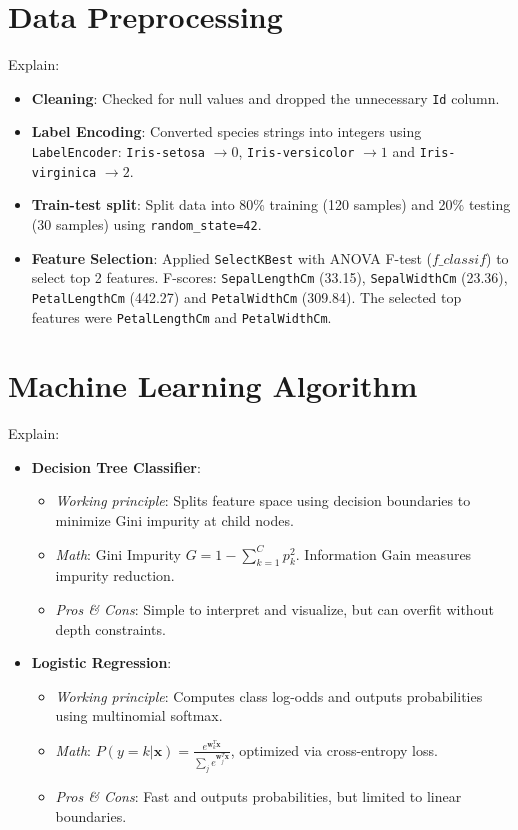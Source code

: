 \documentclass[12pt,a4paper]{article}
\begin{document}
\section{Data Preprocessing}

Explain:
\begin{itemize}
\item \textbf{Cleaning}: Checked for null values and dropped the unnecessary \texttt{Id} column.
\item \textbf{Label Encoding}: Converted species strings into integers using \texttt{LabelEncoder}: \texttt{Iris-setosa} $\rightarrow 0$, \texttt{Iris-versicolor} $\rightarrow 1$ and \texttt{Iris-virginica} $\rightarrow 2$.
\item \textbf{Train-test split}: Split data into 80\% training (120 samples) and 20\% testing (30 samples) using \texttt{random\_state=42}.
\item \textbf{Feature Selection}: Applied \texttt{SelectKBest} with ANOVA F-test ($f\_classif$) to select top 2 features. F-scores: \texttt{SepalLengthCm} (33.15), \texttt{SepalWidthCm} (23.36), \texttt{PetalLengthCm} (442.27) and \texttt{PetalWidthCm} (309.84). The selected top features were \texttt{PetalLengthCm} and \texttt{PetalWidthCm}.
\end{itemize}

\section{Machine Learning Algorithm}

Explain:
\begin{itemize}
\item \textbf{Decision Tree Classifier}:
\begin{itemize}
\item \textit{Working principle}: Splits feature space using decision boundaries to minimize Gini impurity at child nodes.
\item \textit{Math}: Gini Impurity $G = 1 - \sum_{k=1}^C p_k^2$. Information Gain measures impurity reduction.
\item \textit{Pros \& Cons}: Simple to interpret and visualize, but can overfit without depth constraints.
\end{itemize}
\item \textbf{Logistic Regression}:
\begin{itemize}
\item \textit{Working principle}: Computes class log-odds and outputs probabilities using multinomial softmax.
\item \textit{Math}: $P(y=k|\mathbf{x}) = \frac{e^{\mathbf{w}_k^T \mathbf{x}}}{\sum_j e^{\mathbf{w}_j^T \mathbf{x}}}$, optimized via cross-entropy loss.
\item \textit{Pros \& Cons}: Fast and outputs probabilities, but limited to linear boundaries.
\end{itemize}
\end{itemize}
\end{document}
